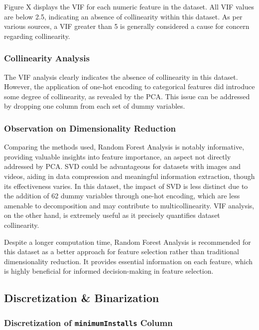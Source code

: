 Figure X displays the VIF for each numeric feature in the dataset. All VIF values are below 2.5, indicating an absence of collinearity within this dataset. As per various sources, a VIF greater than 5 is generally considered a cause for concern regarding collinearity.

\subsubsection{Collinearity Analysis}

The VIF analysis clearly indicates the absence of collinearity in this dataset. However, the application of one-hot encoding to categorical features did introduce some degree of collinearity, as revealed by the PCA. This issue can be addressed by dropping one column from each set of dummy variables.

\subsubsection{Observation on Dimensionality Reduction}

Comparing the methods used, Random Forest Analysis is notably informative, providing valuable insights into feature importance, an aspect not directly addressed by PCA. SVD could be advantageous for datasets with images and videos, aiding in data compression and meaningful information extraction, though its effectiveness varies. In this dataset, the impact of SVD is less distinct due to the addition of 62 dummy variables through one-hot encoding, which are less amenable to decomposition and may contribute to multicollinearity. VIF analysis, on the other hand, is extremely useful as it precisely quantifies dataset collinearity.

Despite a longer computation time, Random Forest Analysis is recommended for this dataset as a better approach for feature selection rather than traditional dimensionality reduction. It provides essential information on each feature, which is highly beneficial for informed decision-making in feature selection.

\subsection{Discretization \& Binarization}
\subsubsection{Discretization of \texttt{minimumInstalls} Column}

